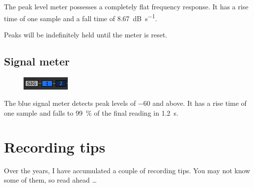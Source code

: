The peak level meter possesses a completely flat frequency response.
It has a rise time of one sample and a fall time of
\SI{8.67}{\dB\per\second}.

Peaks will be indefinitely held until the meter is reset.

\section{Signal meter}

\begin{figure}
  \includegraphics[scale=0.625,clip]{include/images/level_meter_signal.png}
\end{figure}

The blue signal meter detects peak levels of \SI{-60}{\dBFS} and
above.  It has a rise time of one sample and falls to
\SI{99}{\percent} of the final reading in \SI{1.2}{\second}.

\chapter{Recording tips}
\label{chap:recording_tips}

Over the years, I have accumulated a couple of recording tips.  You
may not know some of them, so read ahead \dots

